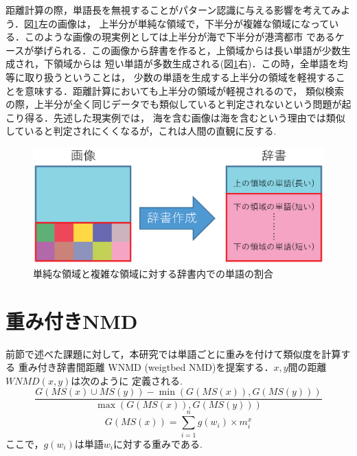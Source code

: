 距離計算の際，単語長を無視することがパターン認識に与える影響を考えてみよう．図\ref{fig:created_image.eps}左の画像は，
上半分が単純な領域で，下半分が複雑な領域になっている．このような画像の現実例としては上半分が海で下半分が港湾都市
であるケースが挙げられる．この画像から辞書を作ると，上領域からは長い単語が少数生成され，下領域からは
短い単語が多数生成される(図\ref{fig:created_image.eps}右)．この時，全単語を均等に取り扱うということは，
少数の単語を生成する上半分の領域を軽視することを意味する．距離計算においても上半分の領域が軽視されるので，
類似検索の際，上半分が全く同じデータでも類似していると判定されないという問題が起こり得る．先述した現実例では，
海を含む画像は海を含むという理由では類似していると判定されにくくなるが，これは人間の直観に反する.


%
%

\begin{figure}[tb]
\begin{center}
\includegraphics[clip, width=\columnwidth]{image/created_image_1.eps}
\caption{単純な領域と複雑な領域に対する辞書内での単語の割合}
\label{fig:created_image.eps}
\end{center}
\end{figure}
\section{重み付きNMD}
前節で述べた課題に対して，本研究では単語ごとに重みを付けて類似度を計算する
重み付き辞書間距離 WNMD (weigtbed NMD)を提案する．$x,y$間の距離$WNMD(x,y)$は次のように
定義される.
$$
\frac{G(MS(x) \cup MS(y)) - \min(G(MS(x)) , G(MS(y)))}{\max(G(MS(x)) , G(MS(y)))}
$$
\begin{equation}
G(MS(x)) = \sum_{i=1}^n g(w_i)\times m_i^x
\end{equation}
ここで，$g(w_i)$は単語$w_i$に対する重みである.

